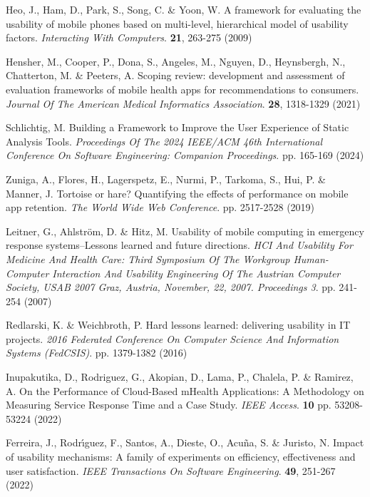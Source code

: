 \documentclass[preprint,12pt]{elsarticle}
\begin{document}
\begin{thebibliography}{99}
Heo, J., Ham, D., Park, S., Song, C. \& Yoon, W. A framework for evaluating the usability of mobile phones based on multi-level, hierarchical model of usability factors. {\em Interacting With Computers}. \textbf{21}, 263-275 (2009)

Hensher, M., Cooper, P., Dona, S., Angeles, M., Nguyen, D., Heynsbergh, N., Chatterton, M. \& Peeters, A. Scoping review: development and assessment of evaluation frameworks of mobile health apps for recommendations to consumers. {\em Journal Of The American Medical Informatics Association}. \textbf{28}, 1318-1329 (2021)

Schlichtig, M. Building a Framework to Improve the User Experience of Static Analysis Tools. {\em Proceedings Of The 2024 IEEE/ACM 46th International Conference On Software Engineering: Companion Proceedings}. pp. 165-169 (2024)

Zuniga, A., Flores, H., Lagerspetz, E., Nurmi, P., Tarkoma, S., Hui, P. \& Manner, J. Tortoise or hare? Quantifying the effects of performance on mobile app retention. {\em The World Wide Web Conference}. pp. 2517-2528 (2019)

Leitner, G., Ahlström, D. \& Hitz, M. Usability of mobile computing in emergency response systems–Lessons learned and future directions. {\em HCI And Usability For Medicine And Health Care: Third Symposium Of The Workgroup Human-Computer Interaction And Usability Engineering Of The Austrian Computer Society, USAB 2007 Graz, Austria, November, 22, 2007. Proceedings 3}. pp. 241-254 (2007)

Redlarski, K. \& Weichbroth, P. Hard lessons learned: delivering usability in IT projects. {\em 2016 Federated Conference On Computer Science And Information Systems (FedCSIS)}. pp. 1379-1382 (2016)

Inupakutika, D., Rodriguez, G., Akopian, D., Lama, P., Chalela, P. \& Ramirez, A. On the Performance of Cloud-Based mHealth Applications: A Methodology on Measuring Service Response Time and a Case Study. {\em IEEE Access}. \textbf{10} pp. 53208-53224 (2022)

Ferreira, J., Rodr\'{\i}guez, F., Santos, A., Dieste, O., Acuña, S. \& Juristo, N. Impact of usability mechanisms: A family of experiments on efficiency, effectiveness and user satisfaction. {\em IEEE Transactions On Software Engineering}. \textbf{49}, 251-267 (2022)


\end{thebibliography}
\end{document}
